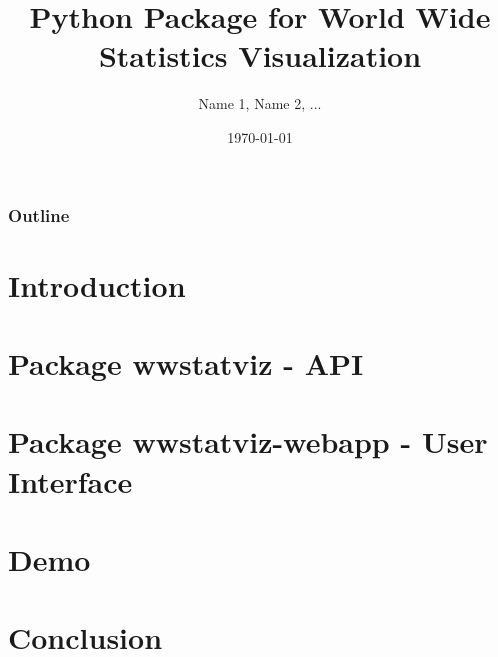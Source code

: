 \documentclass{beamer}
\title{Python Package for World Wide Statistics Visualization}
\subtitle{}
\author{\footnotesize{Name 1, Name 2, ...}}
\date{\today}
\institute{Université de Montpellier}
\begin{document}
\begin{frame}[plain]
  \titlepage
\end{frame}

\small
\begin{frame}[plain]
  \frametitle{Outline}
  \tableofcontents
\end{frame}
\normalsize

\section{Introduction}


\section{Package wwstatviz - API}


\section{Package wwstatviz-webapp - User Interface}


\section{Demo}


\section{Conclusion}

\end{document}
